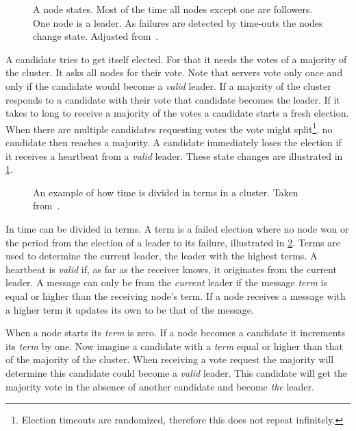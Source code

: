 \begin{figure}[htbp]
	\centering
	
	\caption{A \raft{} node states. Most of the time all nodes except one are followers. One node is a leader. As failures are detected by time-outs the nodes change state. Adjusted from~\cite{raft}.}
	\label{fig:raft_states}
\end{figure}
%
A candidate tries to get itself elected. For that it needs the votes of a majority of the cluster. It asks all nodes for their vote. Note that servers vote only once and only if the candidate would become a \emph{valid} leader. If a majority of the cluster responds to a candidate with their vote that candidate becomes the leader. If it takes to long to receive a majority of the votes a candidate starts a fresh election. When there are multiple candidates requesting votes the vote might split\footnote{Election timeouts are randomized, therefore this does not repeat infinitely.}, no candidate then reaches a majority. A candidate immediately loses the election if it receives a heartbeat from a \emph{valid} leader. These state changes are illustrated in \cref{fig:raft_states}.

\begin{figure}[htbp]
	\centering
	
	\caption{An example of how time is divided in terms in a \raft{} cluster. Taken from~\cite{raft}.}
	\label{fig:raft_terms}
\end{figure}

In \raft{} time can be divided in terms. A term is a failed election where no node won or the period from the election of a leader to its failure, illustrated in \cref{fig:raft_terms}. Terms are used to determine the current leader, the leader with the highest terms. A heartbeat is \emph{valid} if, as far as the receiver knows, it originates from the current leader. A message can only be from the \textit{current} leader if the message \textit{term} is equal or higher than the receiving node's term. If a node receives a message with a higher term it updates its own to be that of the message.

When a node starts its \textit{term} is zero. If a node becomes a candidate it increments its \textit{term} by one. Now imagine a candidate with a \textit{term} equal or higher than that of the majority of the cluster. When receiving a vote request the majority will determine this candidate could become a \emph{valid} leader. This candidate will get the majority vote in the absence of another candidate and become \textit{the} leader.

